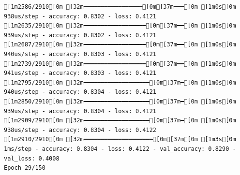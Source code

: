 \documentclass[
  letterpaper,
  DIV=11,
  numbers=noendperiod]{scrartcl}
\begin{document}
\begin{verbatim}
[1m2586/2910[0m [32m━━━━━━━━━━━━━━━━━[0m[37m━━━[0m [1m0s[0m 938us/step - accuracy: 0.8302 - loss: 0.4121
[1m2635/2910[0m [32m━━━━━━━━━━━━━━━━━━[0m[37m━━[0m [1m0s[0m 939us/step - accuracy: 0.8302 - loss: 0.4121
[1m2687/2910[0m [32m━━━━━━━━━━━━━━━━━━[0m[37m━━[0m [1m0s[0m 940us/step - accuracy: 0.8303 - loss: 0.4121
[1m2739/2910[0m [32m━━━━━━━━━━━━━━━━━━[0m[37m━━[0m [1m0s[0m 941us/step - accuracy: 0.8303 - loss: 0.4121
[1m2795/2910[0m [32m━━━━━━━━━━━━━━━━━━━[0m[37m━[0m [1m0s[0m 940us/step - accuracy: 0.8304 - loss: 0.4121
[1m2850/2910[0m [32m━━━━━━━━━━━━━━━━━━━[0m[37m━[0m [1m0s[0m 939us/step - accuracy: 0.8304 - loss: 0.4121
[1m2909/2910[0m [32m━━━━━━━━━━━━━━━━━━━[0m[37m━[0m [1m0s[0m 938us/step - accuracy: 0.8304 - loss: 0.4122
[1m2910/2910[0m [32m━━━━━━━━━━━━━━━━━━━━[0m[37m[0m [1m3s[0m 1ms/step - accuracy: 0.8304 - loss: 0.4122 - val_accuracy: 0.8290 - val_loss: 0.4008
Epoch 29/150


\end{verbatim}
\end{document}
